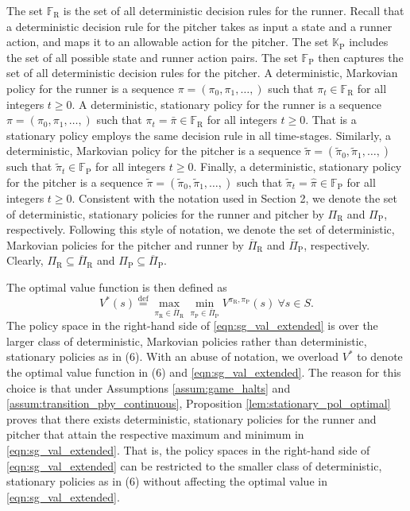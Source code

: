 \documentclass[opre,dblanonrev]{informs4}
\newcommand{\defeq}{\stackrel{\text{def}}{=}}
\begin{document}
\begin{APPENDICES}
       \noindent The set $\mathbb{F}_\text{R}$ is the set of all deterministic decision rules for the runner. Recall that a deterministic decision rule for the pitcher takes as input a state and a runner action, and maps it to an allowable action for the pitcher. The set $\mathbb{K}_\text{P}$ includes the set of all possible state and runner action pairs. The set $\mathbb{F}_\text{P}$ then captures the set of all deterministic decision rules for the pitcher. A deterministic, Markovian policy for the runner is a sequence $\pi = (\pi_0,\pi_1,\ldots,)$ such that $\pi_t \in \mathbb{F}_\text{R}$ for all integers $t \geq 0$. A deterministic, stationary policy for the runner is a sequence $\pi = (\pi_0,\pi_1,\ldots,)$ such that $\pi_t = \bar\pi \in \mathbb{F}_\text{R}$ for all integers $t \geq 0$. That is a stationary policy employs the same decision rule in all time-stages. Similarly, a deterministic, Markovian policy for the pitcher is a sequence $\tilde\pi = (\tilde\pi_0,\tilde\pi_1,\ldots,)$ such that $\tilde\pi_t \in \mathbb{F}_\text{P}$ for all integers $t \geq 0$. Finally, a deterministic, stationary policy for the pitcher is a sequence $\tilde\pi = (\tilde\pi_0,\tilde\pi_1,\ldots,)$ such that $\tilde\pi_t = \hat\pi \in \mathbb{F}_\text{P}$ for all integers $t \geq 0$. Consistent with the notation used in Section 2, we denote the set of deterministic, stationary policies for the runner and pitcher by $\Pi_\text{R}$ and $\Pi_\text{P}$, respectively. Following this style of notation, we denote the set of deterministic, Markovian policies for the pitcher and runner by $\overline\Pi_\text{R}$ and $\overline\Pi_\text{P}$, respectively. Clearly, $\Pi_\text{R} \subseteq \overline\Pi_\text{R}$ and $\Pi_\text{P} \subseteq \overline\Pi_\text{P}$.
    
       The optimal value function is then defined as
       \begingroup
       \allowdisplaybreaks
       \begin{equation}
            \label{eqn:sg_val_extended}
            V^*(s) \defeq \max_{\pi_\text{R} \in \overline\Pi_\text{R}}\min_{\pi_\text{P} \in \overline\Pi_\text{P}}V^{\pi_\text{R},\pi_\text{P}}(s) \ \forall s \in S.
       \end{equation}
       \endgroup
       The policy space in the right-hand side of \eqref{eqn:sg_val_extended} is over the larger class of deterministic, Markovian policies rather than deterministic, stationary policies as in (6). With an abuse of notation, we overload $V^*$ to denote the optimal value function in (6) and \eqref{eqn:sg_val_extended}. The reason for this choice is that under Assumptions \ref{assum:game_halts} and \ref{assum:transition_pby_continuous}, Proposition \ref{lem:stationary_pol_optimal} proves that there exists  deterministic, stationary policies for the runner and pitcher that attain the respective maximum and minimum in \eqref{eqn:sg_val_extended}. That is, the policy spaces in the right-hand side of \eqref{eqn:sg_val_extended} can be restricted to the smaller class of deterministic, stationary policies as in (6) without affecting the optimal value in \eqref{eqn:sg_val_extended}. 
        

\end{APPENDICES}
\end{document}
